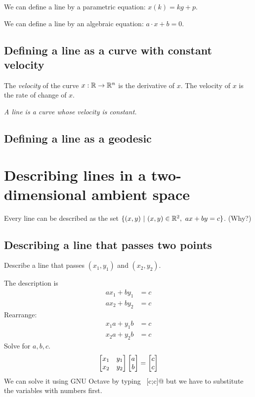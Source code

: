 We can define a line by a parametric equation: \( x(k) = k g + p \).

We can define a line by an algebraic equation: \( a \cdot x + b = 0 \).

\subsection{Defining a line as a curve with constant velocity}

The \emph{velocity} of the curve \( x : \mathbb{R} \to \mathbb{R}^n \) is the derivative of \(x\).
The velocity of \(x\) is the rate of change of \(x\).

\emph{A line is a curve whose velocity is constant.}

\subsection{Defining a line as a geodesic}

\section{Describing lines in a two-dimensional ambient space}

Every line can be described as the set
\( \{ (x,y) ~|~ (x,y) \in \mathbb{R}^2, ~ a x + b y = c \} \).
(Why?)

\subsection{Describing a line that passes two points}

Describe a line that passes \((x_1,y_1)\) and \((x_2,y_2)\).

The description is
\begin{align*}
    a x_1 + b y_1 &= c
    \\
    a x_2 + b y_2 &= c
\end{align*}
Rearrange:
\begin{align*}
    x_1 a + y_1 b &= c
    \\
    x_2 a + y_2 b &= c
\end{align*}
Solve for \(a,b,c\).
\begin{align*}
    \begin{bmatrix}x_1 & y_1 \\ x_2 & y_2\end{bmatrix} \begin{bmatrix}a \\ b\end{bmatrix} = \begin{bmatrix}c \\ c\end{bmatrix}
\end{align*}
We can solve it using GNU Octave by typing \verb@[x1,y1;x2,y2] \ [c;c]@
but we have to substitute the variables with numbers first.

